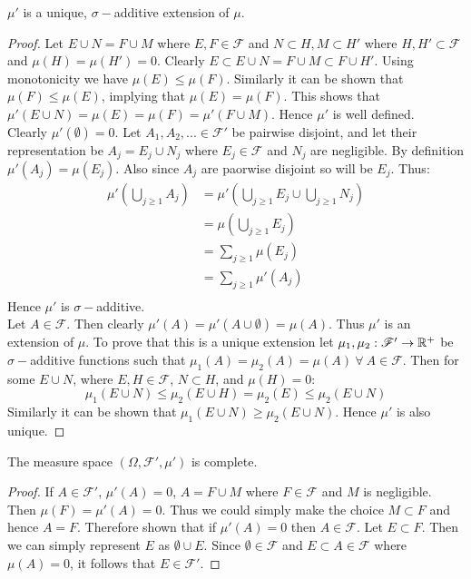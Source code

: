 \begin{proposition}
  $\mu'$ is a unique, $\sigma-$additive extension of $\mu$.
\end{proposition}
\begin{proof}
  Let $E\cup N = F\cup M$ where $E,F\in \mathscr{F}$ and $N\subset H, M\subset H'$ where $H,H'\subset \mathscr{F}$ and $\mu(H) = \mu(H') =0$. Clearly $E \subset E\cup N = F\cup M \subset F\cup H'$. Using monotonicity we have $\mu(E)\leq \mu(F)$. Similarly it can be shown that $\mu(F)\leq \mu(E)$, implying that $\mu(E) = \mu(F)$. This shows that $\mu'(E\cup N) = \mu(E) = \mu(F) = \mu'(F\cup M)$. Hence $\mu'$ is well defined.\\

  Clearly $\mu'(\emptyset) = 0$. Let $A_1,A_2,...\in \mathscr{F}'$ be pairwise disjoint, and let their representation be $A_j = E_j \cup N_j$ where $E_j\in \mathscr{F}$ and $N_j$ are negligible. By definition $\mu'(A_j) = \mu(E_j)$. Also since $A_j$ are paorwise disjoint so will be $E_j$. Thus:
  \begin{align*}
    \mu'(\bigcup_{j\geq1}A_j) &= \mu'(\bigcup_{j\geq1} E_j\cup \bigcup_{j\geq1}N_j)\\
                     &= \mu(\bigcup_{j\geq1}E_j)\\
                     &= \sum_{j\geq1}\mu(E_j)\\
                     &= \sum_{j\geq1}\mu'(A_j)\\
  \end{align*}
  Hence $\mu'$ is $\sigma-$additive.\\

  Let $A \in \mathscr{F}$. Then clearly $\mu'(A) = \mu'(A\cup \emptyset) = \mu(A)$. Thus $\mu'$ is an extension of $\mu$. To prove that this is a unique extension let $\mu_1,\mu_2: \mathscr{F}' \to \mathbb{R}^+$ be $\sigma-$additive functions such that $\mu_1(A) = \mu_2(A) = \mu(A)\ \forall\ A\in \mathscr{F}$. Then for some $E\cup N$, where $E, H\in \mathscr{F}$, $N\subset H$, and $\mu(H) = 0$:
  \[\mu_1(E\cup N) \leq \mu_2(E\cup H) = \mu_2(E) \leq \mu_2(E\cup N)\]
  Similarly it can be shown that $\mu_1(E\cup N) \geq \mu_2(E\cup N)$. Hence $\mu'$ is also unique.
\end{proof}
\begin{proposition}
  The measure space $(\Omega, \mathscr{F}', \mu')$ is complete. 
\end{proposition}
\begin{proof}
  If $A\in \mathscr{F}'$, $\mu'(A)= 0$, $A = F\cup M$ where $F\in \mathscr{F}$ and $M$ is negligible. Then $\mu(F) = \mu'(A) =0$. Thus we could simply make the choice $M\subset F$ and hence $A=F$. Therefore shown that if $\mu'(A) = 0$ then $A\in \mathscr{F}$. Let $E\subset F$. Then we can simply represent $E$ as $\emptyset\cup E$. Since $\emptyset \in \mathscr{F}$ and $E \subset A \in \mathscr{F}$ where $\mu(A) = 0$, it follows that $E\in \mathscr{F}'$. 
\end{proof}
